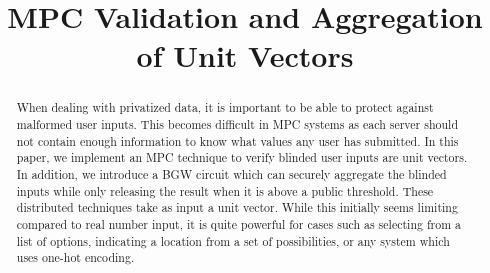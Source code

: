 \documentclass[conference]{IEEEtran}
\begin{document}
\title{MPC Validation and Aggregation of Unit Vectors
	}


\author{}


% 








\maketitle

\begin{abstract}
When dealing with privatized data, it is important to be able to protect against malformed user inputs. This becomes difficult in MPC systems as each server should not contain enough information to know what values any user has submitted. In this paper, we implement an MPC technique to verify blinded user inputs are unit vectors. In addition, we introduce a BGW circuit which can securely aggregate the blinded inputs while only releasing the result when it is above a public threshold. These distributed techniques take as input a unit vector. While this initially seems limiting compared to real number input, it is quite powerful for cases such as selecting from a list of options, indicating a location from a set of possibilities, or any system which uses one-hot encoding. \\
\end{abstract}
\end{document}
